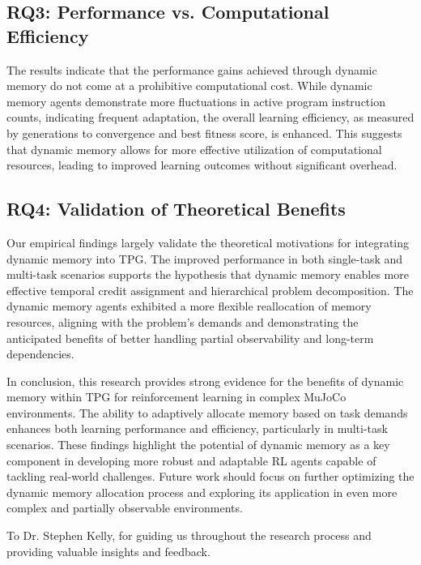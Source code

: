 \documentclass[sigconf]{acmart}
\begin{document}
\subsection{RQ3: Performance vs. Computational Efficiency}
The results indicate that the performance gains achieved through dynamic memory do not come at a 
prohibitive computational cost. While dynamic memory agents demonstrate more fluctuations in active 
program instruction counts, indicating frequent adaptation, the overall learning efficiency, as measured 
by generations to convergence and best fitness score, is enhanced. This suggests that dynamic memory 
allows for more effective utilization of computational resources, leading to improved learning outcomes without significant overhead.

\subsection{RQ4: Validation of Theoretical Benefits}
Our empirical findings largely validate the theoretical motivations 
for integrating dynamic memory into TPG. The improved performance in both single-task and multi-task scenarios supports 
the hypothesis that dynamic memory enables more effective temporal credit assignment and hierarchical problem decomposition. 
The dynamic memory agents exhibited a more flexible reallocation of memory resources, aligning with the problem's demands 
and demonstrating the anticipated benefits of better handling partial observability and long-term dependencies.

In conclusion, this research provides strong evidence for the benefits of dynamic memory within TPG for reinforcement 
learning in complex MuJoCo environments. The ability to adaptively allocate memory based on task demands enhances both 
learning performance and efficiency, particularly in multi-task scenarios. These findings highlight the potential of 
dynamic memory as a key component in developing more robust and adaptable RL agents capable of tackling real-world challenges. 
Future work should focus on further optimizing the dynamic memory allocation process and exploring its application 
in even more complex and partially observable environments.

\begin{acks}
To Dr. Stephen Kelly, for guiding us throughout the research process and providing valuable insights and feedback.
\end{acks}
\end{document}
